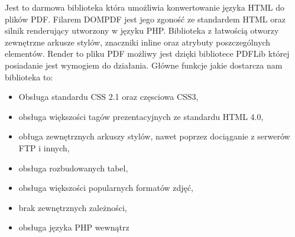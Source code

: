 Jest to darmowa biblioteka która umożliwia konwertowanie języka HTML do plików PDF. Filarem DOMPDF jest jego zgoność ze standardem HTML oraz silnik renderujący utworzony w języku PHP. 
Biblioteka z łatwością otworzy zewnętrzne arkusze stylów, znaczniki inline oraz atrybuty poszczególnych elementów.
Render to pliku PDF możliwy jest dzięki bibliotece PDFLib której posiadanie jest wymogiem do działania.
Główne funkcje jakie dostarcza nam biblioteka to:

\begin{itemize}
    \item Obsługa standardu CSS 2.1 oraz częsciowa CSS3,
    \item obsługa większości tagów prezentacyjnych ze standardu HTML 4.0,
    \item obługa zewnętrznych arkuszy stylów, nawet poprzez dociąganie z serwerów FTP i innych,
    \item obsługa rozbudowanych tabel,
    \item obsługa większości popularnych formatów zdjęć,
    \item brak zewnętrznych zależności,
    \item obsługa języka PHP wewnątrz
\end{itemize}